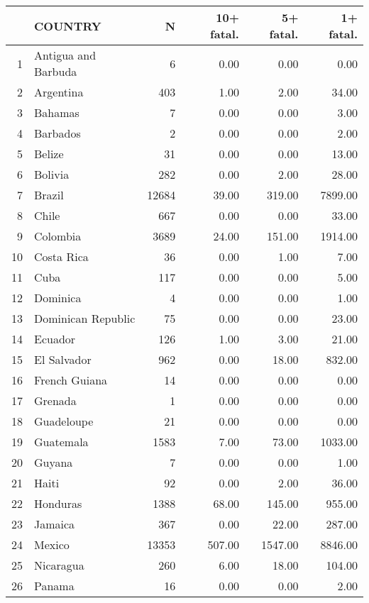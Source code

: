 \begin{table}[ht]
\centering
\begin{tabular}{rlrrrr}
  \hline
 & COUNTRY & N & 10+ fatal. & 5+ fatal. & 1+ fatal. \\ 
  \hline
1 & Antigua and Barbuda &   6 & 0.00 & 0.00 & 0.00 \\ 
  2 & Argentina & 403 & 1.00 & 2.00 & 34.00 \\ 
  3 & Bahamas &   7 & 0.00 & 0.00 & 3.00 \\ 
  4 & Barbados &   2 & 0.00 & 0.00 & 2.00 \\ 
  5 & Belize &  31 & 0.00 & 0.00 & 13.00 \\ 
  6 & Bolivia & 282 & 0.00 & 2.00 & 28.00 \\ 
  7 & Brazil & 12684 & 39.00 & 319.00 & 7899.00 \\ 
  8 & Chile & 667 & 0.00 & 0.00 & 33.00 \\ 
  9 & Colombia & 3689 & 24.00 & 151.00 & 1914.00 \\ 
  10 & Costa Rica &  36 & 0.00 & 1.00 & 7.00 \\ 
  11 & Cuba & 117 & 0.00 & 0.00 & 5.00 \\ 
  12 & Dominica &   4 & 0.00 & 0.00 & 1.00 \\ 
  13 & Dominican Republic &  75 & 0.00 & 0.00 & 23.00 \\ 
  14 & Ecuador & 126 & 1.00 & 3.00 & 21.00 \\ 
  15 & El Salvador & 962 & 0.00 & 18.00 & 832.00 \\ 
  16 & French Guiana &  14 & 0.00 & 0.00 & 0.00 \\ 
  17 & Grenada &   1 & 0.00 & 0.00 & 0.00 \\ 
  18 & Guadeloupe &  21 & 0.00 & 0.00 & 0.00 \\ 
  19 & Guatemala & 1583 & 7.00 & 73.00 & 1033.00 \\ 
  20 & Guyana &   7 & 0.00 & 0.00 & 1.00 \\ 
  21 & Haiti &  92 & 0.00 & 2.00 & 36.00 \\ 
  22 & Honduras & 1388 & 68.00 & 145.00 & 955.00 \\ 
  23 & Jamaica & 367 & 0.00 & 22.00 & 287.00 \\ 
  24 & Mexico & 13353 & 507.00 & 1547.00 & 8846.00 \\ 
  25 & Nicaragua & 260 & 6.00 & 18.00 & 104.00 \\ 
  26 & Panama &  16 & 0.00 & 0.00 & 2.00 \\ 

\end{tabular}
\end{table}
